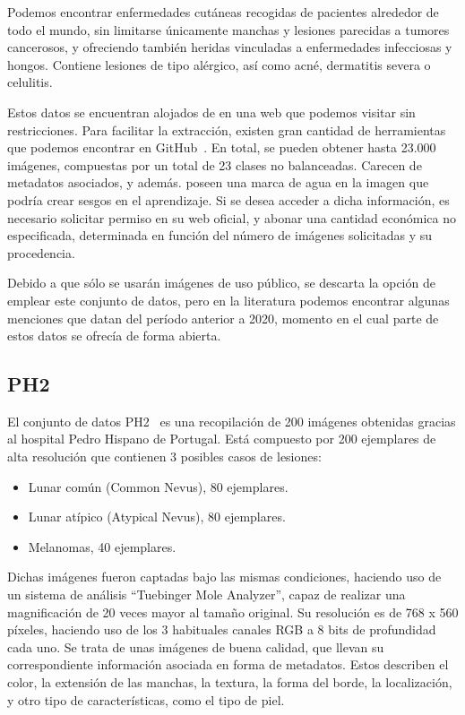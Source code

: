 Podemos encontrar enfermedades cutáneas recogidas de pacientes alrededor de todo el mundo, sin limitarse únicamente manchas  y lesiones parecidas a tumores cancerosos, y ofreciendo también heridas vinculadas a enfermedades infecciosas y hongos.  Contiene lesiones	 de tipo alérgico, así como acné, dermatitis severa o celulitis.

Estos datos se encuentran alojados de en una web que podemos visitar sin restricciones. Para facilitar la extracción,  existen gran cantidad de herramientas que podemos encontrar en GitHub~\cite{githubdermnet}. En total, se pueden obtener hasta 23.000 imágenes, compuestas por un total de 23 clases no balanceadas. Carecen de metadatos asociados, y además. poseen una marca de agua en la imagen que podría crear sesgos en el aprendizaje. Si se desea acceder a dicha información, es necesario solicitar permiso en su web oficial, y abonar una cantidad económica no especificada, determinada en función del  número de imágenes solicitadas y su procedencia.

Debido a que sólo se usarán imágenes de uso público, se descarta la opción de emplear este conjunto de datos, pero en la literatura podemos encontrar algunas menciones que datan del período anterior a 2020, momento en el cual parte de estos datos se ofrecía de forma abierta.


\subsection{PH2}
El conjunto de datos PH2~\cite{ph2} es una recopilación de 200 imágenes obtenidas gracias al hospital Pedro Hispano de Portugal. Está compuesto por 200 ejemplares de alta resolución que contienen 3 posibles casos de lesiones:
\begin{itemize}
	\item Lunar común (Common Nevus), 80 ejemplares.
	\item Lunar atípico (Atypical Nevus), 80 ejemplares.
	\item Melanomas, 40 ejemplares.
\end{itemize}

Dichas imágenes fueron captadas bajo las mismas condiciones, haciendo uso de un  sistema de análisis ``Tuebinger Mole Analyzer'', capaz de realizar una magnificación de 20 veces mayor al tamaño original. Su resolución es de  768 x 560 píxeles, haciendo uso de los 3 habituales canales RGB a 8 bits de profundidad cada uno. Se trata de unas imágenes de buena calidad, que llevan su correspondiente información asociada en forma de metadatos. Estos describen el color, la extensión de las manchas, la textura, la forma del borde, la localización, y otro tipo de características, como el tipo de piel.

